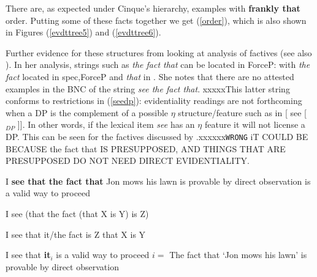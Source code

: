 \documentclass{article}
\begin{document}
There are, as expected under Cinque's hierarchy, examples with {\bf frankly that} order. Putting some of these facts together we get (\ref{order}), which is also shown in Figures (\ref{evdttree5}) and (\ref{evdttree6}).

% 

Further evidence for these structures from looking at  analysis of factives (see also \cite{simons07obs}). In her analysis, strings such as {\sl the fact that} can be located in ForceP: with {\sl the fact} located in spec,ForceP and {\sl that} in . She notes that there are no attested examples in the BNC of the string {\sl see the fact that}. xxxxxThis latter string conforms to restrictions in (\ref{seedp}): evidentiality readings are not forthcoming when a DP is the complement of a possible $\eta$ structure/feature such as in [ see [$_{DP}$ ]]. In other words, if the lexical item {\sl see} has an $\eta$ feature it will not license a DP. This can be seen for the factives discussed by \cite{vangelderen05cpsplit}.xxxxxx\texttt{WRONG} iT COULD BE BECAUSE the fact that IS PRESUPPOSED, AND THINGS THAT ARE PRESUPPOSED DO NOT NEED DIRECT EVIDENTIALITY.

\begin{exe}
\label{seethefactthat}
\ex I {\bf see that the fact that} Jon mows his lawn is provable by direct observation is a valid way to proceed\label{seethatthefactthat}
\begin{xlist}
\ex I see (that the fact (that X is Y) is Z)
\begin{xlist}
\ex I see that it/the fact is Z
\ex that X is Y
\end{xlist}
\ex I see that {\bf it$_{i}$} is a valid way to proceed
\ex $i =$ The fact that `Jon mows his lawn' is provable by direct observation 
\end{xlist}
\end{exe} 
\end{document}
